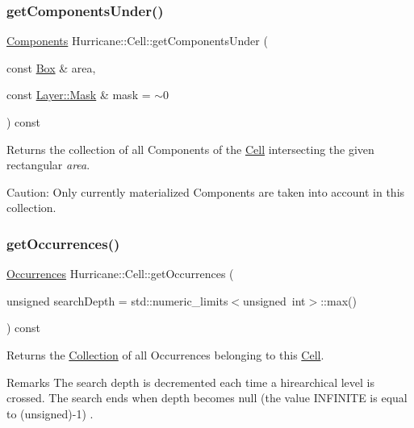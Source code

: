 \subsubsection{\texorpdfstring{get\+Components\+Under()}{getComponentsUnder()}}
{\footnotesize\ttfamily \mbox{\hyperlink{namespaceHurricane_a7d26d99aeb5dd6d70d51bd35d2473e72}{Components}} Hurricane\+::\+Cell\+::get\+Components\+Under (\begin{DoxyParamCaption}\item[{const \mbox{\hyperlink{classHurricane_1_1Box}{Box}} \&}]{area,  }\item[{const \mbox{\hyperlink{classHurricane_1_1Layer_af5277c670637bd5d910237e7afe01a91}{Layer\+::\+Mask}} \&}]{mask = {\ttfamily $\sim$0} }\end{DoxyParamCaption}) const}

Returns the collection of all Components of the \mbox{\hyperlink{classHurricane_1_1Cell}{Cell}} intersecting the given rectangular {\itshape area}.

\begin{DoxyParagraph}{Caution\+: Only currently materialized Components are taken into account}
in this collection. 
\end{DoxyParagraph}
\mbox{\label{classHurricane_1_1Cell_ab5bbab0a59106855d61deb94805e6115}} 
\subsubsection{\texorpdfstring{get\+Occurrences()}{getOccurrences()}}
{\footnotesize\ttfamily \mbox{\hyperlink{namespaceHurricane_a1912927c128eee859af62dbe4cbe0a6b}{Occurrences}} Hurricane\+::\+Cell\+::get\+Occurrences (\begin{DoxyParamCaption}\item[{unsigned}]{search\+Depth = {\ttfamily std\+:\+:numeric\+\_\+limits$<$unsigned~int$>$\+:\+:max()} }\end{DoxyParamCaption}) const}

Returns the \mbox{\hyperlink{classHurricane_1_1Collection}{Collection}} of all Occurrences belonging to this \mbox{\hyperlink{classHurricane_1_1Cell}{Cell}}.

\begin{DoxyRemark}{Remarks}
The search depth is decremented each time a hirearchical level is crossed. The search ends when depth becomes null (the value {\ttfamily I\+N\+F\+I\+N\+I\+TE} is equal to {\ttfamily }(unsigned)-\/1) . 
\end{DoxyRemark}
\mbox{\label{classHurricane_1_1Cell_a7fb09c8e350923c47ce4c4407bdb00ce}} 

